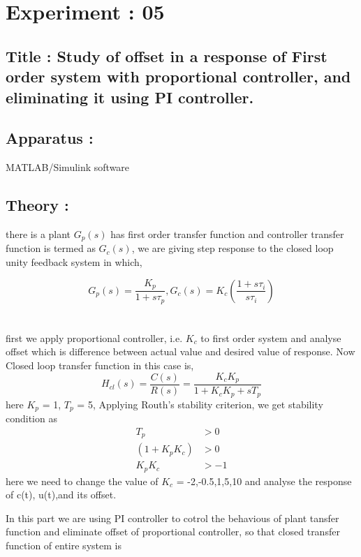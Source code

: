 \message{ !name(lab1.tex)}\documentclass[a4paper,12pt,openany]{book}
\begin{document}
\chapter{Experiment : 05}
\section{Title : Study of offset in a response of First order system with proportional controller, and
eliminating it using PI controller.}

\section{Apparatus :}
MATLAB/Simulink software

\section{Theory :}
there is a plant $G_p(s)$ has first order transfer function and controller
transfer function is
termed as $G_c(s)$, we are giving step response to the closed loop unity
feedback system in which,

\begin{equation}
  G_p(s) = \frac{K_p}{1 + s\tau_p},    G_c(s) = K_c(\frac{1+ s\tau_i}{s\tau_i})  
 \end{equation}\\
  \\
  first we apply proportional controller, i.e. $K_c$ to first order system and
  analyse offset which is difference between actual value and desired value of
  response.
  Now Closed loop transfer function in this case is,
 \begin{equation}
    H_{cl}(s)=\frac{C(s)}{R(s)} = \frac{K_c K_p}{1 + K_cK_p+ s T_p}
 \end{equation}
    here $K_p$ = 1, $T_p$ = 5,
    Applying Routh's stability criterion, we get stability condition as
\begin{align}
      T_p &> 0 \\
     (1 + K_pK_c) &> 0\\
     K_p K_c &> -1
\end{align}
here we need to change the value of $K_c$ = -2,-0.5,1,5,10 and analyse the
response of c(t), u(t),and its offset.

\noindent{}\par
\noindent In this part we are using PI controller to cotrol the behavious of plant tansfer
function and eliminate offset of proportional controller, so that closed
transfer function of entire system is
\end{document}
